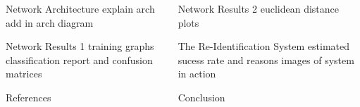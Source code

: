 \documentclass[final]{beamer}
\begin{document}
\begin{frame}{}
\begin{columns}[t]
\begin{column}{.49\linewidth}
\begin{block}{Network Architecture}
		explain arch add in arch diagram
          
        \end{block}
	
        \begin{block}{Network Results 1}
		training graphs classification report and confusion matrices

        \end{block}
        
                    \begin{block}{References}
			\scriptsize
		
    \end{block}
    
    
	 \end{column}
	 \begin{column}{.49\linewidth}
 		\begin{block}{Network Results 2}
 		euclidean distance plots
 		
         
        \end{block}
        
        \begin{block}{The Re-Identification System}
        estimated sucess rate and reasons
        images of system in action
       
 		\hspace{.7cm}
        
        
        \hspace{.7cm}
        \end{block}
        
       	\begin{block}{Conclusion}

        
        \end{block}

      \end{column}
    \end{columns}
     

  \end{frame}
\end{document}
